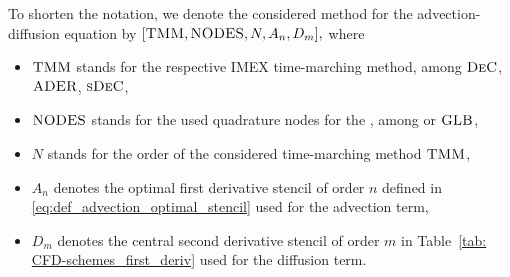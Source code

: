 \begin{definition}	\label{defi: notation_pde_method}
	To shorten the notation, we denote the considered method for the advection-diffusion equation by $[\textsc{TMM},\textsc{NODES},N, A_n,D_m],$ where
	\begin{itemize}
		\item $\textsc{TMM}$ stands for the respective IMEX time-marching method, among $\textsc{DeC}$, $\textsc{ADER}$, $\textsc{sDeC}$,
		\item $\textsc{NODES}$ stands for the used quadrature nodes for the \TMM, among {\eq} or $\textsc{GLB}$,
		\item $N$ stands for the order of the considered time-marching method $\textsc{TMM}$,
		\item $A_n$ denotes the optimal first derivative stencil of order $n$ defined in \eqref{eq:def_advection_optimal_stencil} used for the advection term,
		\item $D_m$ denotes the central second derivative stencil of order $m$ in Table~\ref{tab: CFD-schemes_first_deriv} used for the diffusion term.
	\end{itemize}
\end{definition}
